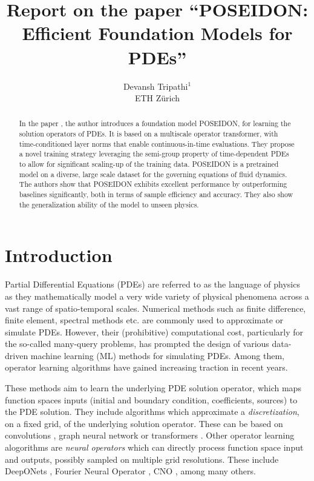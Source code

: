 \documentclass[reqno,10pt]{amsart}
\title{Report on the paper ``{\Large P}OSEIDON: Efficient Foundation Models for PDEs''}
\author{Devansh Tripathi$^1$ \\ ETH Z\lowercase{\"urich}}
\theoremstyle{plain}
\theoremstyle{definition}
\begin{document}

\begin{abstract}
    In the paper \cite{MH2024}, the author introduces a foundation model {\large P}OSEIDON, for learning the solution operators of PDEs. It is based on a multiscale operator transformer, with time-conditioned layer norms that enable continuous-in-time evaluations. They propose a novel training strategy leveraging the semi-group property of time-dependent PDEs to allow for significant scaling-up of the training data. {\large P}OSEIDON is a pretrained model on a diverse, large scale dataset for the governing equations of fluid dynamics. The authors show that {\large P}OSEIDON exhibits excellent performance by outperforming baselines significantly, both in terms of sample efficiency and accuracy. They also show the generalization ability of the model to unseen physics.
\end{abstract}
\maketitle
\section{\bf Introduction}
\noindent Partial Differential Equations (PDEs) are referred to as the language of physics as they mathematically model a very wide variety of physical phenomena across a vast range of spatio-temporal scales. Numerical methods such as finite difference, finite element, spectral methods etc. are commonly used to approximate or simulate PDEs. However, their (prohibitive) computational cost, particularly for the so-called many-query problems, has prompted the design of various data-driven machine learning (ML) methods for simulating PDEs. Among them, operator learning algorithms have gained increasing traction in recent years.

\noindent These methods aim to learn the underlying PDE solution operator, which maps function spaces inputs (initial and boundary condition, coefficients, sources) to the PDE solution. They include algorithms which approximate a {\it discretization}, on a fixed grid, of the underlying solution operator. These can be based on convolutions \cite{YZ2018}, graph neural network \cite{TP2021,ASG2020} or transformers \cite{MP2022,ZH2023}. Other operator learning alogorithms are {\it neural operators} which can directly process function space input and outputs, possibly sampled on multiple grid resolutions. These include DeepONets \cite{LL2021}, Fourier Neural Operator \cite{ZL2021}, CNO \cite{BR2023}, among many others.
\end{document}
